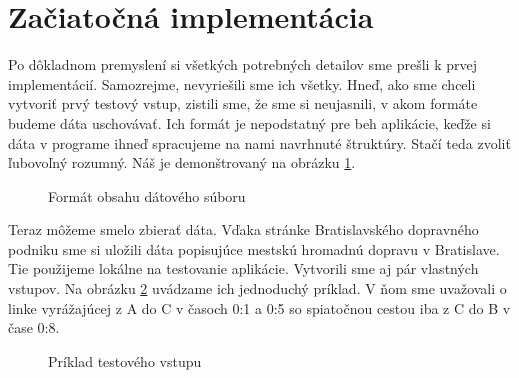 \section{Začiatočná implementácia}

Po dôkladnom premyslení si všetkých potrebných detailov sme prešli k prvej implementácií. Samozrejme, nevyriešili sme ich všetky. Hneď, ako sme chceli vytvoriť prvý testový vstup, zistili sme, že sme si neujasnili, v akom formáte budeme dáta uschovávať. Ich formát je nepodstatný pre beh aplikácie, keďže si dáta v programe ihneď spracujeme na nami navrhnuté štruktúry. Stačí teda zvoliť ľubovoľný rozumný. Náš je demonštrovaný na obrázku \ref{Format_datoveho_suboru}.\newline

\begin{figure}[H]
  \caption{Formát obsahu dátového súboru}
  \label{Format_datoveho_suboru}
\end{figure}

Teraz môžeme smelo zbierať dáta. Vďaka stránke Bratislavského dopravného podniku sme si uložili dáta popisujúce mestskú hromadnú dopravu v Bratislave. Tie použijeme lokálne na testovanie aplikácie. Vytvorili sme aj pár vlastných vstupov. Na obrázku \ref{priklad_vstupu_1} uvádzame ich jednoduchý príklad. V ňom sme uvažovali o linke vyrážajúcej z A do C v časoch 0:1 a 0:5 so spiatočnou cestou iba z C do B v čase 0:8.\newline

\begin{figure}[H]
  \caption{Príklad testového vstupu}
  \label{priklad_vstupu_1}
\end{figure}

